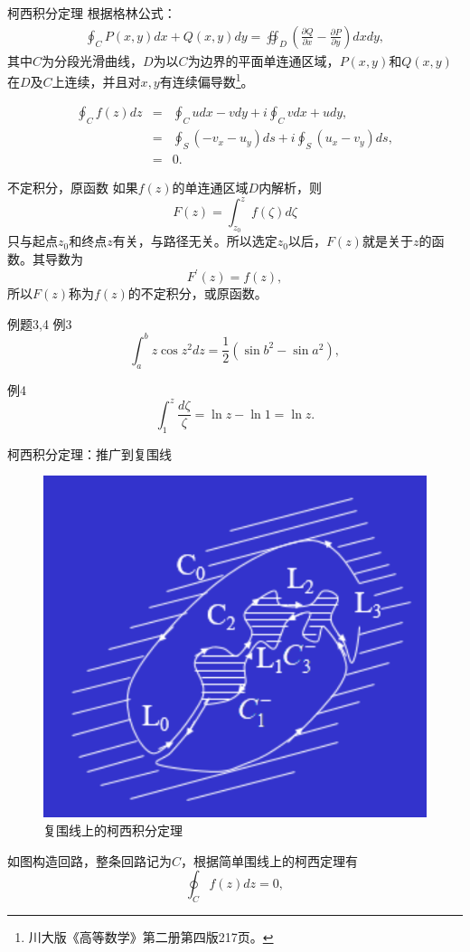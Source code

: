\documentclass[11pt]{beamer}
\newcommand{\kong}[1][0.5]{\vspace{#1cm}}
\begin{document}
\begin{frame}{柯西积分定理}
根据格林公式：
\begin{eqnarray}
\oint_C P(x,y)dx + Q(x,y)dy = \oiint_D (\frac{\partial Q}{\partial x} - \frac{\partial P}{\partial y}) dxdy,
\end{eqnarray}
其中$C$为分段光滑曲线，$D$为以$C$为边界的平面单连通区域，$P(x,y)$和$Q(x,y)$在$D$及$C$上连续，并且对$x,y$有连续偏导数\footnote{川大版《高等数学》第二册第四版217页。}。

\begin{eqnarray}
\oint_C f(z) dz &=& \oint_C udx - vdy + i\oint_C vdx + udy, \\
&=& \oint_S (- v_x - u_y)ds + i \oint_S (u_x - v_y) ds, \\
&=& 0.
\end{eqnarray}

\end{frame}

\begin{frame}{不定积分，原函数}
如果$f(z)$的单连通区域$D$内解析，则
\begin{equation}
F(z) = \int^z_{z_0} f(\zeta) d\zeta
\end{equation}
只与起点$z_0$和终点$z$有关，与路径无关。所以选定$z_0$以后，$F(z)$就是关于$z$的函数。其导数为
\begin{equation}
F^\prime(z) = f(z),
\end{equation}
所以$F(z)$称为$f(z)$的不定积分，或原函数。
\end{frame}

\begin{frame}{例题3,4}
例3
\begin{equation}
\int^b_a z \cos z^2 dz = \frac{1}{2}(\sin b^2 - \sin a^2),
\end{equation}

\kong[0.5]
例4
\begin{equation}
\int^z_1 \frac{d \zeta}{ \zeta} = \ln z - \ln 1 = \ln z.
\end{equation}
\end{frame}

\begin{frame}{柯西积分定理：推广到复围线}
\begin{figure}
	\centering
	\includegraphics[width=0.5\linewidth]{chap3复围线}
	\caption{复围线上的柯西积分定理}
	\label{fig:chap3}
\end{figure}
如图构造回路，整条回路记为$C$，根据简单围线上的柯西定理有
\begin{equation}
\oint_C f(z) dz = 0,
\end{equation}
\end{frame}
\end{document}
